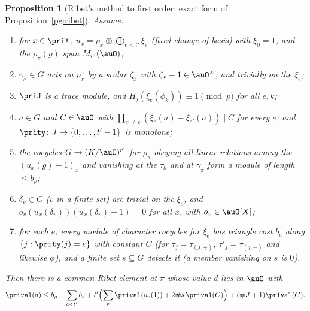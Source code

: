 \documentclass[10pt]{amsart}
\newtheorem{proposition}[theorem]{Proposition}
\theoremstyle{definition}
\theoremstyle{remark}
\begin{document}
\begin{proposition}[Ribet's method to first order; exact form of Proposition~\ref{pg:ribet}]
\label{pri:ribet}
Assume:
\begin{enumerate}
\item[(1)] for $x\in\priX$, $u_x=\rho_x\oplus\bigoplus_{e<t'}\xi_e$ (fixed change of basis) with
$\xi_0=1$, and the $\rho_\pi(g)$ span $M_{r'}(\auO)$;
\item[(2)] $\gamma_x\in G$ acts on $\rho_x$ by a scalar $\zeta_x$ with $\zeta_x-1\in\auO^\times$, and
trivially on the $\xi_e$;
\item[(3)] $\priJ$ is a trace module, and $H_j(\xi_e(\phi_k))\equiv1\pmod p$ for all $e,k$;
\item[(4)] $a\in G$ and $C\in\auO$ with $\prod_{e'\ne e}(\xi_e(a)-\xi_{e'}(a))\mid C$ for every $e$;
and $\prity\colon J\to\{0,\dots,t'-1\}$ is monotone;
\item[(5)] the cocycles $G\to(K/\auO)^{r'}$ for $\rho_\pi$ obeying all linear relations among the
$(u_x(g)-1)_x$ and vanishing at the $\tau_k$ and at $\gamma_\pi$ form a module of length $\le b_\rho$;
\item[(6)] $\delta_v\in G$ ($v$ in a finite set) are trivial on the $\xi_e$, and $o_v(u_x(\delta_v))
(u_x(\delta_v)-1)=0$ for all $x$, with $o_v\in\auO[X]$;
\item[(7)] for each $e$, every module of character cocycles for $\xi_e$ has triangle cost $b_e$
along $\{j:\prity(j)=e\}$ with constant $C$ (for $\tau_j=\tau_{(j,+)}$, $\tau'_j=\tau_{(j,-)}$ and
likewise $\phi$), and a finite set $s\subseteq G$ detects it (a member vanishing on $s$ is $0$).
\end{enumerate}
Then there is a common Ribet element at $\pi$ whose value $d$ lies in $\auO$ with
\[
\prival(d)\le b_\rho+\sum_{e<t'}b_e+t'\Bigl(\sum_v\prival(o_v(1))+2\#s\,\prival(C)\Bigr)+(\#J+1)
\prival(C).
\]
\end{proposition}
\end{document}
